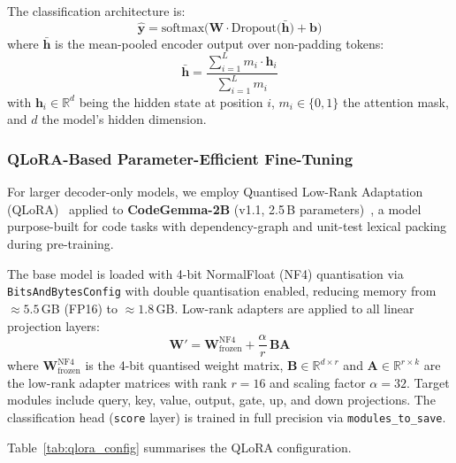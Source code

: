 The classification architecture is:
\begin{equation}
    \hat{\mathbf{y}} = \text{softmax}\!\Big(
        \mathbf{W} \cdot \text{Dropout}\!\big(
            \bar{\mathbf{h}}
        \big) + \mathbf{b}
    \Big)
\label{eq:classifier}
\end{equation}
where $\bar{\mathbf{h}}$ is the mean-pooled encoder output over non-padding
tokens:
\begin{equation}
    \bar{\mathbf{h}} = \frac{
        \sum_{i=1}^{L} m_i \cdot \mathbf{h}_i
    }{
        \sum_{i=1}^{L} m_i
    }
\label{eq:mean_pool}
\end{equation}
with $\mathbf{h}_i \in \mathbb{R}^{d}$ being the hidden state at position
$i$, $m_i \in \{0,1\}$ the attention mask, and $d$ the model's hidden
dimension.

\subsubsection{QLoRA-Based Parameter-Efficient Fine-Tuning}
For larger decoder-only models, we employ Quantised Low-Rank Adaptation
(QLoRA)~\cite{dettmers2023qlora} applied to \textbf{CodeGemma-2B}
(v1.1, 2.5\,B parameters)~\cite{team2024codegemma}, a model
purpose-built for code tasks with dependency-graph and unit-test
lexical packing during pre-training.

The base model is loaded with 4-bit NormalFloat (NF4) quantisation via
\texttt{BitsAndBytesConfig} with double quantisation enabled, reducing
memory from $\approx\!5.5$\,GB (FP16) to $\approx\!1.8$\,GB.  Low-rank
adapters are applied to all linear projection layers:
\begin{equation}
    \mathbf{W}' = \mathbf{W}_{\text{frozen}}^{\text{NF4}}
                 + \frac{\alpha}{r}\,\mathbf{B}\mathbf{A}
\label{eq:lora}
\end{equation}
where $\mathbf{W}_{\text{frozen}}^{\text{NF4}}$ is the 4-bit quantised
weight matrix, $\mathbf{B} \in \mathbb{R}^{d \times r}$ and
$\mathbf{A} \in \mathbb{R}^{r \times k}$ are the low-rank adapter
matrices with rank $r = 16$ and scaling factor $\alpha = 32$.  Target
modules include query, key, value, output, gate, up, and down projections.
The classification head (\texttt{score} layer) is trained in full
precision via \texttt{modules\_to\_save}.

Table~\ref{tab:qlora_config} summarises the QLoRA configuration.

